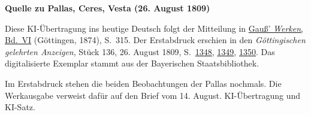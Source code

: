 \clearpage\thispagestyle{empty}
\begin{center}\textbf{Quelle zu Pallas, Ceres, Vesta (26. August 1809)}\end{center}
\noindent Diese KI-Übertragung ins heutige Deutsch folgt der Mitteilung in \href{https://gdz.sub.uni-goettingen.de/id/PPN236007467}{Gauß’ \textit{Werken}, Bd.~VI} (Göttingen, 1874), S.~315. Der Erstabdruck erschien in den \textit{Göttingischen gelehrten Anzeigen}, Stück 136, 26. August 1809, S.~\href{https://api.digitale-sammlungen.de/iiif/image/v2/bsb10538676_00340/full/1600,/0/default.jpg}{1348}, \href{https://api.digitale-sammlungen.de/iiif/image/v2/bsb10538676_00341/full/1600,/0/default.jpg}{1349}, \href{https://api.digitale-sammlungen.de/iiif/image/v2/bsb10538676_00342/full/1600,/0/default.jpg}{1350}. Das digitalisierte Exemplar stammt aus der Bayerischen Staatsbibliothek.
\par\smallskip\noindent Im Erstabdruck stehen die beiden Beobachtungen der Pallas nochmals. Die Werkausgabe verweist dafür auf den Brief vom 14. August. KI-Übertragung und KI-Satz.
\clearpage
